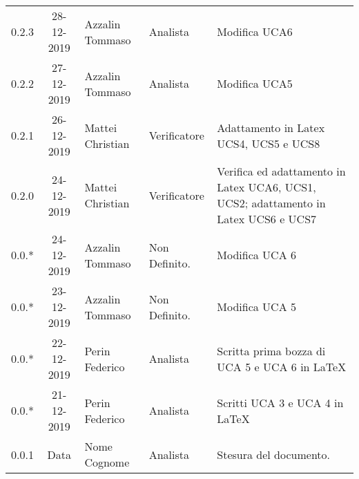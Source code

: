 {\begin{longtable}{ c c  C{4cm}  C{3cm} C{4cm}}
0.2.3 & 28-12-2019 & Azzalin Tommaso & Analista & Modifica UCA6 \\

0.2.2 & 27-12-2019 & Azzalin Tommaso & Analista & Modifica UCA5 \\

0.2.1 & 26-12-2019 & Mattei Christian & Verificatore & Adattamento in Latex UCS4, UCS5 e UCS8 \\

0.2.0 & 24-12-2019 & Mattei Christian & Verificatore & Verifica ed adattamento in Latex UCA6, UCS1, UCS2; adattamento in Latex UCS6 e UCS7 \\

0.0.* & 24-12-2019 & Azzalin Tommaso & Non Definito. & Modifica UCA 6\\

0.0.* & 23-12-2019 & Azzalin Tommaso & Non Definito. & Modifica UCA 5\\

0.0.* & 22-12-2019 & Perin Federico & Analista & Scritta prima bozza di UCA 5 e UCA 6 in LaTeX\\

0.0.* & 21-12-2019 & Perin Federico & Analista & Scritti UCA 3 e UCA 4 in LaTeX\\

0.0.1 & Data & Nome Cognome & Analista & Stesura del documento.  \\		
		
\end{longtable}
}